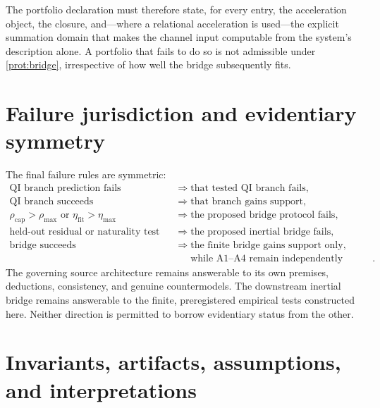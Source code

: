 \documentclass[11pt]{article}
\begin{document}
The portfolio declaration must therefore state, for every entry, the acceleration object, the closure, and---where a relational acceleration is used---the explicit summation domain that makes the channel input computable from the system's description alone. A portfolio that fails to do so is not admissible under \cref{prot:bridge}, irrespective of how well the bridge subsequently fits.

\section{Failure jurisdiction and evidentiary symmetry}
\label{sec:failure}

The final failure rules are symmetric:
\begin{align}
\text{QI branch prediction fails}
&\Longrightarrow
\text{that tested QI branch fails},\\
\text{QI branch succeeds}
&\Longrightarrow
\text{that branch gains support},\\
\rho_{\mathrm{cap}}>\rho_{\max}
\text{ or }\eta_{\mathrm{fit}}>\eta_{\max}
&\Longrightarrow
\text{the proposed bridge protocol fails},\\
\text{held-out residual or naturality test fails}
&\Longrightarrow
\text{the proposed inertial bridge fails},\\
\text{bridge succeeds}
&\Longrightarrow
\text{the finite bridge gains support only},\\
&\phantom{\Longrightarrow}
\text{while A1--A4 remain independently assessed}.
\end{align}
The governing source architecture remains answerable to its own premises, deductions, consistency, and genuine countermodels. The downstream inertial bridge remains answerable to the finite, preregistered empirical tests constructed here. Neither direction is permitted to borrow evidentiary status from the other.

\section{Invariants, artifacts, assumptions, and interpretations}
\end{document}

